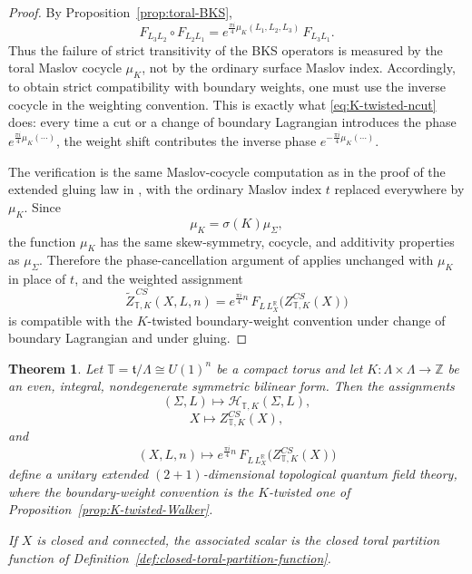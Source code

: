 \documentclass[12pt]{amsart}
\numberwithin{equation}{section}
\newtheorem{theorem}{Theorem}[section]
\begin{document}
\begin{proof}
By Proposition~\ref{prop:toral-BKS},
\[
F_{L_3L_2}\circ F_{L_2L_1}
=
e^{\frac{\pi i}{4}\mu_K(L_1,L_2,L_3)}\,F_{L_3L_1}.
\]
Thus the failure of strict transitivity of the BKS operators is measured by the toral
Maslov cocycle \(\mu_K\), not by the ordinary surface Maslov index. Accordingly, to obtain strict compatibility with boundary weights, one must use the inverse
cocycle in the weighting convention. This is exactly what \eqref{eq:K-twisted-ncut} does:
every time a cut or a change of boundary Lagrangian introduces the phase
\(e^{\frac{\pi i}{4}\mu_K(\cdots)}\),
the weight shift contributes the inverse phase
\(e^{-\frac{\pi i}{4}\mu_K(\cdots)}\).

The verification is the same Maslov-cocycle computation as in the proof of the
extended gluing law in \cite[Thm.~VI.11(e), eq.~(VI.28)]{Manoliu2}, with the ordinary
Maslov index \(t\) replaced everywhere by \(\mu_K\). Since
\[
\mu_K=\sigma(K)\mu_\Sigma,
\]
the function \(\mu_K\) has the same skew-symmetry, cocycle, and additivity properties as
\(\mu_\Sigma\). Therefore the phase-cancellation argument of \cite[Thm.~VI.11(e)]{Manoliu2}
applies unchanged with \(\mu_K\) in place of \(t\), and the weighted assignment
\[
\widetilde Z^{\,CS}_{\mathbb T,K}(X,L,n)
=
e^{\frac{\pi i}{4}n}\,
F_{L\,L_X^{\mathbb R}}\!\bigl(Z^{CS}_{\mathbb T,K}(X)\bigr)
\]
is compatible with the \(K\)-twisted boundary-weight convention under change of boundary
Lagrangian and under gluing.
\end{proof}

\begin{theorem}
\label{thm:toral-TQFT}
Let $\mathbb T=\mathfrak t/\Lambda\cong U(1)^n$ be a compact torus and let
$K:\Lambda\times\Lambda\to\mathbb Z$ be an even, integral, nondegenerate
symmetric bilinear form. Then the assignments
\[
(\Sigma,L)\longmapsto \mathcal H_{\mathbb T,K}(\Sigma,L),
\]
\[
X\longmapsto Z^{CS}_{\mathbb T,K}(X),
\]
and
\[
(X,L,n)\longmapsto
e^{\frac{\pi i}{4}n}\,
F_{L\,L_X^{\mathbb R}}\!\bigl(Z^{CS}_{\mathbb T,K}(X)\bigr)
\]
define a unitary extended \((2+1)\)-dimensional
topological quantum field theory, where the boundary-weight convention is the
\(K\)-twisted one of Proposition~\ref{prop:K-twisted-Walker}.

If $X$ is closed and connected, the associated scalar is the closed toral
partition function of Definition~\ref{def:closed-toral-partition-function}.
\end{theorem}
\end{document}
